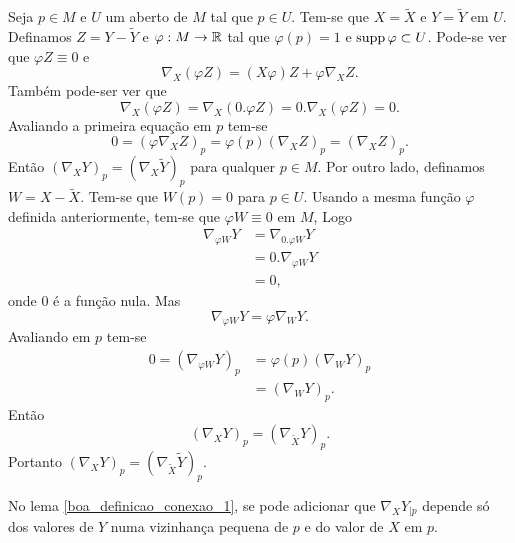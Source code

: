 \begin{demonstracao}
	Seja $p \in M$ e $U$ um aberto de $M$ tal que $p \in U$. Tem-se que $X = \tilde{X}$ e $Y = \tilde{Y}$ em $U$. Definamos $Z = Y - \tilde{Y}$ e $\varphi: M \rightarrow \mathbb{R}$ tal que $\varphi(p)=1$ e $\operatorname{supp} \varphi \subset U$. Pode-se ver que $\varphi Z \equiv 0$ e
	\begin{equation*}
		\nabla_X (\varphi Z) = (X \varphi) Z + \varphi \nabla_X Z.
	\end{equation*}
	Também pode-ser ver que
	\begin{equation*}
		\nabla_X (\varphi Z)  = \nabla_X (0 . \varphi Z) = 0 . \nabla_X (\varphi Z) = 0.
	\end{equation*}
	Avaliando a primeira equação em $p$ tem-se
	\begin{equation*}
		0 = (\varphi \nabla_X Z)_p = \varphi(p) (\nabla_X Z)_p = (\nabla_X Z)_p.
	\end{equation*}
	Então $(\nabla_X Y)_p = (\nabla_X \tilde{Y})_p$ para qualquer $p \in M$.
	Por outro lado, definamos $W = X - \tilde{X}$. Tem-se que $W(p) = 0$ para $p \in U$. Usando a mesma função $\varphi$ definida anteriormente, tem-se que $\varphi W \equiv 0$ em $M$, Logo
	\begin{align*}
		\nabla_{\varphi W} Y &= \nabla_{0 . \varphi W} Y\\
		&= 0 . \nabla_{\varphi W} Y\\
		&= 0,
	\end{align*}
	onde $0$ é a função nula. Mas
	\begin{equation*}
		\nabla_{\varphi W} Y = \varphi \nabla_W Y.
	\end{equation*}
	Avaliando em $p$ tem-se
	\begin{align*}
		0 = (\nabla_{\varphi W} Y)_p &= \varphi(p) (\nabla_W Y)_p\\
		&= (\nabla_W Y)_p.
	\end{align*}
	Então
	\begin{equation*}
		(\nabla_X Y)_p = (\nabla_{\tilde{X}} Y)_p.
	\end{equation*}
	Portanto $(\nabla_X Y)_p = (\nabla_{\tilde{X}} \tilde{Y})_p$.
\end{demonstracao}

\begin{lema}\label{boa_definicao_conexao_2}
	No lema \ref{boa_definicao_conexao_1}, se pode adicionar que $\nabla_X Y_{|p}$ depende só dos valores de $Y$ numa vizinhança pequena de $p$ e do valor de $X$ em $p$.
\end{lema}

